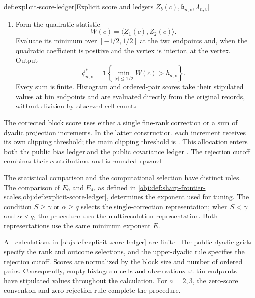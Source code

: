 \documentclass[11pt]{article}
\begin{document}
\begin{algorithmv}{def:explicit-score-ledger}[Explicit score and ledgers \(Z_b(c),\mathfrak b_{n,v},\Lambda_{n,v}\)]
\begin{enumerate}
\[
\mathfrak b_{n,v}=B,
\qquad
\Lambda_{n,v}
=
\frac{L_1^2}{s}
+\frac{2L_2^2}{s(s-1)},
\]
\[
h_{n,v}
=
\mathcal R\!\left(
2B^2+2^{16}\sqrt M\,\Lambda_{n,v}
\right).
\]
Use the public rank and outcome grids
\[
\left\{2^j:0\le j\le\left\lceil\log_2(2s^2)\right\rceil\right\},
\qquad
\left\{2^j:0\le j\le\left\lceil\log_2(2s)\right\rceil\right\},
\]
respectively. The cutoff is the upper endpoint of the two-point dyadic grid bracketing its unrounded formula.
\item Form the quadratic statistic
\[
W(c)=\langle Z_1(c),Z_2(c)\rangle.
\]
Evaluate its minimum over \([-1/2,1/2]\) at the two endpoints and, when the quadratic coefficient is positive and the vertex is interior, at the vertex. Output
\[
\phi^*_{n,v}
=
\mathbf 1\!\left\{
\min_{|c|\le1/2}W(c)>h_{n,v}
\right\}.
\]
Every sum is finite. Histogram and ordered-pair scores take their stipulated values at bin endpoints and are evaluated directly from the original records, without division by observed cell counts.
\end{enumerate}
\end{algorithmv}

The corrected block score  uses either a single fine-rank correction or a sum of dyadic projection increments. In the latter construction, each increment receives its own clipping threshold; the main clipping threshold is . This allocation enters both the public bias ledger  and the public covariance ledger . The rejection cutoff  combines their contributions and is rounded upward.

The statistical comparison and the computational selection have distinct roles. The comparison of \(E_0\) and \(E_4\), as defined in \cref{obj:def:sharp-frontier-scales,obj:def:explicit-score-ledger}, determines the exponent used for tuning. The condition \(S\ge\gamma\) or \(\alpha\ge q\) selects the single-correction representation; when \(S<\gamma\) and \(\alpha<q\), the procedure uses the multiresolution representation. Both representations use the same minimum exponent \(E\).

All calculations in \cref{obj:def:explicit-score-ledger} are finite. The public dyadic grids specify the rank and outcome selections, and the upper-dyadic rule specifies the rejection cutoff. Scores are normalized by the block size and number of ordered pairs. Consequently, empty histogram cells and observations at bin endpoints have stipulated values throughout the calculation. For \(n=2,3\), the zero-score convention and zero rejection rule complete the procedure.
\end{document}
